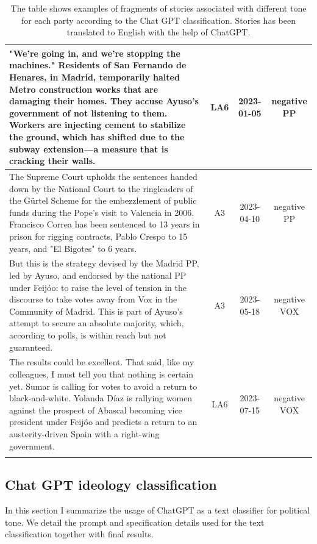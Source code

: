 \documentclass[12pt]{article}
\begin{document}
\begin{longtable}{|p{8cm}|c|c|c|}
		\hline
		"We're going in, and we're stopping the machines." Residents of San Fernando de Henares, in Madrid, temporarily halted Metro construction works that are damaging their homes. They accuse Ayuso's government of not listening to them. Workers are injecting cement to stabilize the ground, which has shifted due to the subway extension—a measure that is cracking their walls. & LA6&  2023-01-05 & negative PP\\
		\hline
		The Supreme Court upholds the sentences handed down by the National Court to the ringleaders of the Gürtel Scheme for the embezzlement of public funds during the Pope's visit to Valencia in 2006. Francisco Correa has been sentenced to 13 years in prison for rigging contracts, Pablo Crespo to 15 years, and "El Bigotes" to 6 years. & A3 & 2023-04-10 & negative PP\\
		\hline
		But this is the strategy devised by the Madrid PP, led by Ayuso, and endorsed by the national PP under Feijóo: to raise the level of tension in the discourse to take votes away from Vox in the Community of Madrid. This is part of Ayuso's attempt to secure an absolute majority, which, according to polls, is within reach but not guaranteed.& A3 & 2023-05-18 & negative VOX\\
		\hline
		The results could be excellent. That said, like my colleagues, I must tell you that nothing is certain yet. Sumar is calling for votes to avoid a return to black-and-white. Yolanda Díaz is rallying women against the prospect of Abascal becoming vice president under Feijóo and predicts a return to an austerity-driven Spain with a right-wing government. & LA6 & 2023-07-15 & negative VOX\\
		\hline
		
		\caption{The table shows examples of fragments of stories associated with different tone for each party according to the Chat GPT classification. Stories has been translated to English with the help of ChatGPT.}
	\end{longtable}
	
	
	
	
	\subsection{Chat GPT ideology classification}\label{sec:chat_gpt}
	
	In this section I summarize the usage of ChatGPT as a text classifier for political tone. We detail the prompt and specification details used for the text classification together with final results. 
	
\end{document}
